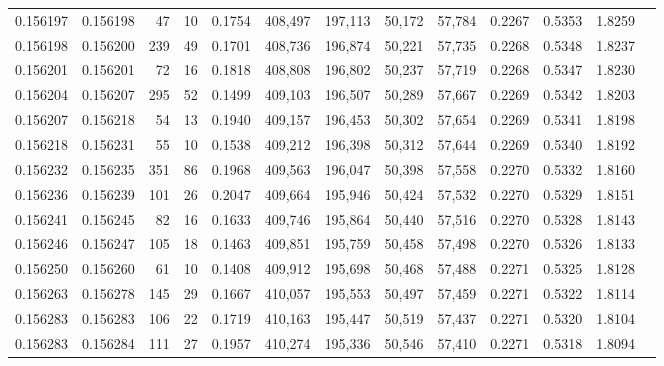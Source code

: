 \begin{tabular}{rrrrrrrrrrrrr}
0.156197 & 0.156198 &    47 &  10 &                                     0.1754 & 408,497 & 197,113 &  50,172 &  57,784 & 0.2267 & 0.5353 & 1.8259 \\
0.156198 & 0.156200 &   239 &  49 &                                     0.1701 & 408,736 & 196,874 &  50,221 &  57,735 & 0.2268 & 0.5348 & 1.8237 \\
0.156201 & 0.156201 &    72 &  16 &                                     0.1818 & 408,808 & 196,802 &  50,237 &  57,719 & 0.2268 & 0.5347 & 1.8230 \\
0.156204 & 0.156207 &   295 &  52 &                                     0.1499 & 409,103 & 196,507 &  50,289 &  57,667 & 0.2269 & 0.5342 & 1.8203 \\
0.156207 & 0.156218 &    54 &  13 &                                     0.1940 & 409,157 & 196,453 &  50,302 &  57,654 & 0.2269 & 0.5341 & 1.8198 \\
0.156218 & 0.156231 &    55 &  10 &                                     0.1538 & 409,212 & 196,398 &  50,312 &  57,644 & 0.2269 & 0.5340 & 1.8192 \\
0.156232 & 0.156235 &   351 &  86 &                                     0.1968 & 409,563 & 196,047 &  50,398 &  57,558 & 0.2270 & 0.5332 & 1.8160 \\
0.156236 & 0.156239 &   101 &  26 &                                     0.2047 & 409,664 & 195,946 &  50,424 &  57,532 & 0.2270 & 0.5329 & 1.8151 \\
0.156241 & 0.156245 &    82 &  16 &                                     0.1633 & 409,746 & 195,864 &  50,440 &  57,516 & 0.2270 & 0.5328 & 1.8143 \\
0.156246 & 0.156247 &   105 &  18 &                                     0.1463 & 409,851 & 195,759 &  50,458 &  57,498 & 0.2270 & 0.5326 & 1.8133 \\
0.156250 & 0.156260 &    61 &  10 &                                     0.1408 & 409,912 & 195,698 &  50,468 &  57,488 & 0.2271 & 0.5325 & 1.8128 \\
0.156263 & 0.156278 &   145 &  29 &                                     0.1667 & 410,057 & 195,553 &  50,497 &  57,459 & 0.2271 & 0.5322 & 1.8114 \\
0.156283 & 0.156283 &   106 &  22 &                                     0.1719 & 410,163 & 195,447 &  50,519 &  57,437 & 0.2271 & 0.5320 & 1.8104 \\
0.156283 & 0.156284 &   111 &  27 &                                     0.1957 & 410,274 & 195,336 &  50,546 &  57,410 & 0.2271 & 0.5318 & 1.8094 \\

\end{tabular}
